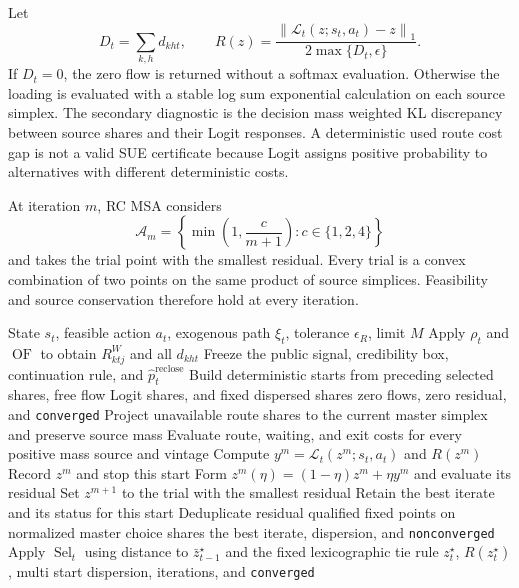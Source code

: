 \documentclass[a4paper,fleqn]{cas-sc}
\newcommand{\norm}[1]{\left\lVert #1 \right\rVert}
\begin{document}
Let
\begin{equation}
 D_t=\sum_{k,h}d_{kht},\qquad
 R(z)=\frac{\norm{\mathcal L_t(z;s_t,a_t)-z}_1}
 {2\max\{D_t,\epsilon\}}.
 \label{eq:fixed-point-residual}
\end{equation}
If $D_t=0$, the zero flow is returned without a softmax evaluation. Otherwise
the loading is evaluated with a stable log sum exponential calculation on each
source simplex. The secondary diagnostic is the decision mass weighted KL
discrepancy between source shares and their Logit responses. A deterministic
used route cost gap is not a valid SUE certificate because Logit assigns
positive probability to alternatives with different deterministic costs.

At iteration $m$, RC MSA considers
\begin{equation}
 \mathcal A_m=\left\{
 \min\left(1,\frac{c}{m+1}\right):c\in\{1,2,4\}
 \right\}
 \label{eq:step-grid}
\end{equation}
and takes the trial point with the smallest residual. Every trial is a convex
combination of two points on the same product of source simplices. Feasibility
and source conservation therefore hold at every iteration.

\begin{algorithm}[t]
\caption{Multi start residual controlled MSA with deterministic selection}
\label{alg:rcmsa}
\begin{algorithmic}[1]
\Require State $s_t$, feasible action $a_t$, exogenous path $\xi_t$, tolerance $\epsilon_R$, limit $M$
\State Apply $\rho_t$ and $\operatorname{OF}$ to obtain $R^W_{ktj}$ and all $d_{kht}$
\State Freeze the public signal, credibility box, continuation rule, and $\widehat p_t^{\mathrm{reclose}}$
\State Build deterministic starts from preceding selected shares, free flow Logit shares, and fixed dispersed shares
  \State \Return zero flows, zero residual, and \texttt{converged}
\EndIf
{}
  \State Project unavailable route shares to the current master simplex and preserve source mass
    \State Evaluate route, waiting, and exit costs for every positive mass source and vintage
    \State Compute $y^m=\mathcal L_t(z^m;s_t,a_t)$ and $R(z^m)$
      \State Record $z^m$ and stop this start
    \EndIf
      \State Form $z^m(\eta)=(1-\eta)z^m+\eta y^m$ and evaluate its residual
    \EndFor
    \State Set $z^{m+1}$ to the trial with the smallest residual
  \EndFor
  \State Retain the best iterate and its status for this start
\EndFor
\State Deduplicate residual qualified fixed points on normalized master choice shares
  \State \Return the best iterate, dispersion, and \texttt{nonconverged}
\EndIf
\State Apply $\operatorname{Sel}_t$ using distance to $\bar z_{t-1}^\star$ and the fixed lexicographic tie rule
\State \Return $z_t^\star$, $R(z_t^\star)$, multi start dispersion, iterations, and \texttt{converged}
\end{algorithmic}
\end{algorithm}
\end{document}
